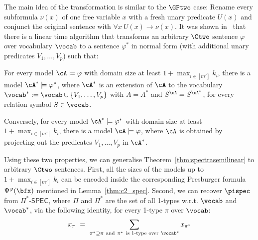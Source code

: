 The main idea of the transformation is similar to the $\GPtwo$ case:
Rename every subformula $\nu(x)$ of one free variable $x$ with a fresh unary predicate $U(x)$ and conjunct the original sentence with $\forall x\  U(x)\to \nu(x)$.
It was shown in~\cite{ctwocomplexity,ianrevisited} that there is a linear time algorithm that transforms
an arbitrary $\Ctwo$ sentence $\varphi$ over vocabulary $\vocab$ to a sentence $\varphi^*$ in normal form (with additional unary predicates $V_1,\ldots,V_p$) such that:
\begin{compactitem}
\item 
For every model $\cA\models \varphi$ with domain size at least $1+\max_{i\in[m']}k_i$,
there is a model $\cA^*\models \varphi^*$, where $\cA^*$ is an extension of $\cA$ to the vocabulary $\vocab^*:=\vocab\cup\{V_1,\ldots,V_p\}$ with
$A=A^*$ and $S^{\cA}=S^{\cA^*}$, for every relation symbol $S\in\vocab$.
\item
Conversely,
for every model $\cA^*\models \varphi^*$ with domain size at least $1+\max_{i\in[m']}k_i$,
there is a model $\cA\models \varphi$, where $\cA$ is obtained by projecting out the predicates $V_1,\ldots,V_p$ in $\cA^*$.
\end{compactitem}
Using these two properties, we can generalise Theorem~\ref{thm:spectrasemilinear} to arbitrary $\Ctwo$ sentences.
First, all the sizes of the models up to 
$1+\max_{i\in [m']} k_i$ can be encoded inside the corresponding Presburger formula $\Psi^\varphi(\bfx)$
mentioned in Lemma~\ref{thm:c2_spec}.
Second, we can recover $\pispec$ from $\Pi^*\textsf{-SPEC}$,
where $\Pi$ and $\Pi^*$ are the set of all 1-types w.r.t. $\vocab$ and $\vocab^*$,
via the following identity, for every 1-type $\pi$ over $\vocab$:
$$
x_{\pi} \ = \
\sum_{\pi^*\supseteq \pi \ \text{and}\ \pi^*\ \text{is 1-type over}\ \vocab^*} x_{\pi^*}
$$
